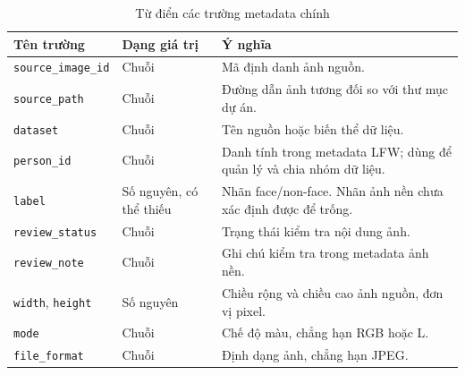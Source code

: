 \documentclass[12pt,a4paper,oneside]{report}
\begin{document}
\begin{table}[H]
    \centering
    \caption{Từ điển các trường metadata chính}
    \label{tab:tudien}
    \small
    \begin{tabularx}{\textwidth}{
        >{\raggedright\arraybackslash}p{3.5cm}
        >{\raggedright\arraybackslash}p{2cm}
        >{\raggedright\arraybackslash}X}
        \toprule
        \textbf{Tên trường}
        & \textbf{Dạng giá trị}
        & \textbf{Ý nghĩa} \\
        \midrule

        \texttt{source\_image\_id}
        & Chuỗi
        & Mã định danh ảnh nguồn. \\

        \texttt{source\_path}
        & Chuỗi
        & Đường dẫn ảnh tương đối so với thư mục dự án. \\

        \texttt{dataset}
        & Chuỗi
        & Tên nguồn hoặc biến thể dữ liệu. \\

        \texttt{person\_id}
        & Chuỗi
        & Danh tính trong metadata LFW;
          dùng để quản lý và chia nhóm dữ liệu. \\

        \texttt{label}
        & Số nguyên, có thể thiếu
        & Nhãn face/non-face.
          Nhãn ảnh nền chưa xác định được để trống. \\

        \texttt{review\_status}
        & Chuỗi
        & Trạng thái kiểm tra nội dung ảnh. \\

        \texttt{review\_note}
        & Chuỗi
        & Ghi chú kiểm tra trong metadata ảnh nền. \\

        \texttt{width}, \texttt{height}
        & Số nguyên
        & Chiều rộng và chiều cao ảnh nguồn,
          đơn vị pixel. \\

        \texttt{mode}
        & Chuỗi
        & Chế độ màu, chẳng hạn RGB hoặc L. \\

        \texttt{file\_format}
        & Chuỗi
        & Định dạng ảnh, chẳng hạn JPEG. \\

        \bottomrule
    \end{tabularx}
\end{table}
\end{document}
